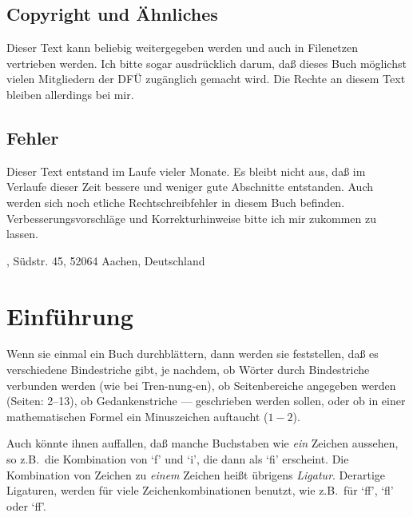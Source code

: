 \section*{Copyright und \"Ahnliches}
Dieser Text kann beliebig weitergegeben werden und auch in
Filenetzen
vertrieben werden. Ich bitte sogar ausdr\"ucklich darum, da\ss{} dieses Buch
m\"oglichst vielen Mitgliedern der DF\"U zu\-g\"ang\-lich gemacht wird. Die
Rechte an diesem Text bleiben allerdings bei mir.
\section*{Fehler}
Dieser Text entstand im Laufe vieler Monate. Es bleibt nicht aus, da\ss{}
im Verlaufe dieser Zeit bessere und weniger gute Abschnitte
entstanden. Auch werden sich noch etliche Recht\-schreib\-feh\-ler in diesem
Buch befinden. Verbesserungsvorschl\"age und Korrekturhinweise bitte ich
mir zukommen zu lassen.

\begin{center}
\end{center}

\vspace*{2cm}
\hspace{\fill}{\bf Fritz Cremer}, S\"udstr. 45, 52064 Aachen, Deutschland
\tableofcontents
\chapter{Einf\"uhrung}
Wenn sie einmal ein Buch durchbl\"attern, dann werden sie feststellen,
da\ss{} es verschiedene 
Bindestriche gibt, je nachdem, ob W\"orter durch
Bindestriche verbunden werden (wie bei Tren-nung-en), ob
Seitenbereiche angegeben werden (Seiten: 2--13), ob
Gedankenstriche
--- ge\-schrie\-ben werden sollen, oder ob in einer mathematischen
Formel ein 
Minuszeichen auftaucht ($1-2$).

Auch k\"onnte ihnen auffallen, da\ss{} manche Buchstaben wie {\em ein}
Zeichen aussehen, so z.B.\ die Kombination von `f' und `i', die dann
als `fi' erscheint. Die Kombination von Zeichen zu {\em einem} Zeichen
hei\ss{}t \"ubrigens 
{\em Ligatur}. Derartige Ligaturen, werden f\"ur viele
Zeichenkombinationen benutzt, wie z.B.\ f\"ur `ff', `fl' oder `ff'.


